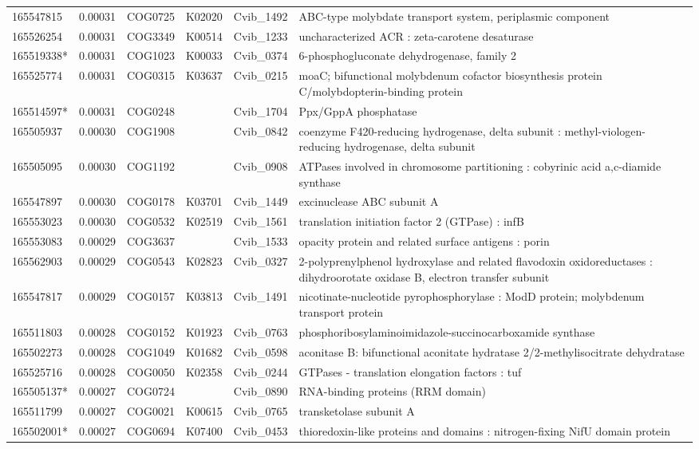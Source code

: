 \begin{landscape}
\begin{longtable}{p{1.6cm}p{1.2cm}p{1.5cm}p{1.5cm}p{2.8cm}p{13.5cm}}
165547815&0.00031&COG0725&K02020&Cvib\_1492&ABC-type molybdate transport system, periplasmic component \\
165526254&0.00031&COG3349&K00514&Cvib\_1233&uncharacterized ACR : zeta-carotene desaturase \\
165519338*&0.00031&COG1023&K00033&Cvib\_0374&6-phosphogluconate dehydrogenase, family 2 \\
165525774&0.00031&COG0315&K03637&Cvib\_0215&moaC; bifunctional molybdenum cofactor biosynthesis protein C/molybdopterin-binding protein \\
165514597*&0.00031&COG0248&&Cvib\_1704&Ppx/GppA phosphatase \\
165505937&0.00030&COG1908&&Cvib\_0842&coenzyme F420-reducing hydrogenase, delta subunit : methyl-viologen-reducing hydrogenase, delta subunit \\
165505095&0.00030&COG1192&&Cvib\_0908&ATPases involved in chromosome partitioning : cobyrinic acid a,c-diamide synthase \\
165547897&0.00030&COG0178&K03701&Cvib\_1449&excinuclease ABC subunit A \\
165553023&0.00030&COG0532&K02519&Cvib\_1561&translation initiation factor 2 (GTPase) : infB \\
165553083&0.00029&COG3637&&Cvib\_1533&opacity protein and related surface antigens : porin \\
165562903&0.00029&COG0543&K02823&Cvib\_0327&2-polyprenylphenol hydroxylase and related flavodoxin oxidoreductases : dihydroorotate oxidase B, electron transfer subunit \\
165547817&0.00029&COG0157&K03813&Cvib\_1491&nicotinate-nucleotide pyrophosphorylase : ModD protein; molybdenum transport protein \\
165511803&0.00028&COG0152&K01923&Cvib\_0763&phosphoribosylaminoimidazole-succinocarboxamide synthase \\
165502273&0.00028&COG1049&K01682&Cvib\_0598&aconitase B: bifunctional aconitate hydratase 2/2-methylisocitrate dehydratase \\
165525716&0.00028&COG0050&K02358&Cvib\_0244&GTPases - translation elongation factors : tuf \\
165505137*&0.00027&COG0724&&Cvib\_0890&RNA-binding proteins (RRM domain) \\
165511799&0.00027&COG0021&K00615&Cvib\_0765&transketolase subunit A \\
165502001*&0.00027&COG0694&K07400&Cvib\_0453&thioredoxin-like proteins and domains : nitrogen-fixing NifU domain protein \\

\end{longtable}
\end{landscape}
